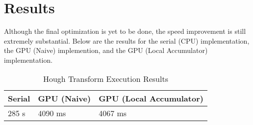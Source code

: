 \documentclass[conference]{IEEEtran}
\begin{document}
\section{Results}
Although the final optimization is yet to be done, the speed improvement is still extremely substantial. Below are the results for the serial (CPU) implementation, the GPU (Naive) implemention, and the GPU (Local Accumulator) implementation. 



\begin{table}
  \caption{Hough Transform Execution Results}
  \label{tab:executionTimes}
  \begin{center}
    \begin{tabular}[c]{l|l|l}
      \hline
      \multicolumn{1}{c|}{\textbf{Serial}} & 
      \multicolumn{1}{c|}{\textbf{GPU (Naive)}} & 
      \multicolumn{1}{c}{\textbf{GPU (Local Accumulator)}} \\
      \hline
      285 s & 4090 ms & 4067 ms\\
      
      \hline
    \end{tabular}
  \end{center}
\end{table}









































\end{document}
